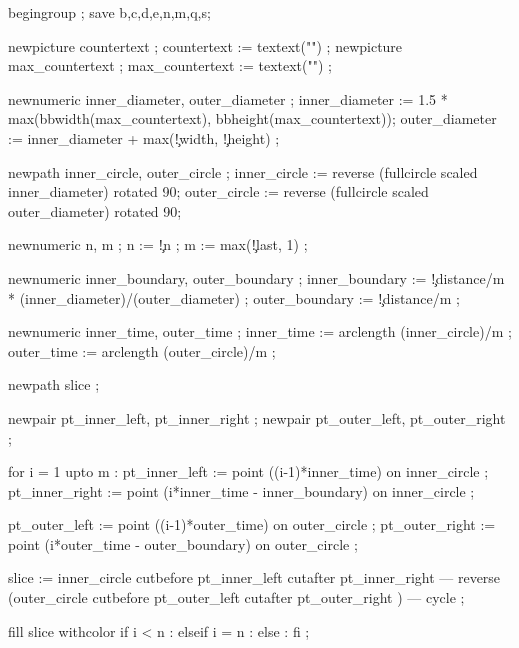   begingroup ;
  save b,c,d,e,n,m,q,s;

  newpicture countertext     ; countertext     := textext("\getvisualcountertext")    ;
  newpicture max_countertext ; max_countertext := textext("\getmaxvisualcountertext") ;

  newnumeric inner_diameter, outer_diameter ;
  inner_diameter := 1.5 * max(bbwidth(max_countertext), bbheight(max_countertext));
  outer_diameter := inner_diameter + 
          max(\visualcounterparameter\c!width, \visualcounterparameter\c!height) ;

  newpath inner_circle, outer_circle ;
  inner_circle := reverse (fullcircle scaled inner_diameter) rotated 90;
  outer_circle := reverse (fullcircle scaled outer_diameter) rotated 90;

  newnumeric n, m ;
  n := \visualcounterparameter\c!n ;
  m := max(\visualcounterparameter\c!last, 1) ;

  newnumeric inner_boundary, outer_boundary ;
  inner_boundary := \visualcounterparameter\c!distance/m * (inner_diameter)/(outer_diameter) ;
  outer_boundary := \visualcounterparameter\c!distance/m ;

  newnumeric inner_time, outer_time ;
  inner_time := arclength (inner_circle)/m ;
  outer_time := arclength (outer_circle)/m ;

  newpath slice ;

  newpair pt_inner_left, pt_inner_right ;
  newpair pt_outer_left, pt_outer_right ;

  for i = 1 upto m : 
    pt_inner_left  := point ((i-1)*inner_time)               on inner_circle ;
    pt_inner_right := point (i*inner_time - inner_boundary)  on inner_circle ;

    pt_outer_left  := point ((i-1)*outer_time)               on outer_circle ;
    pt_outer_right := point (i*outer_time - outer_boundary)  on outer_circle ;

    slice := inner_circle cutbefore pt_inner_left cutafter pt_inner_right 
       --- reverse (outer_circle cutbefore pt_outer_left cutafter pt_outer_right ) 
       --- cycle ;

    fill slice withcolor 
      if i < n     :  
      elseif i = n : 
      else         : 
      fi ;

